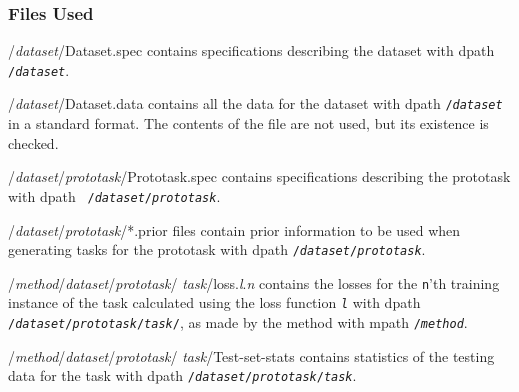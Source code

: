 \subsubsection*{Files Used}
\begin{ttdescription}
\item[/{\rm\em dataset\/}/Dataset.spec]
    contains specifications describing the dataset with dpath
    \texttt{/{\rm\em dataset}}.
\item[/{\rm\em dataset\/}/Dataset.data]
    contains all the data for the dataset with dpath
    \texttt{/{\rm\em dataset}} in a \delve{} standard format.  The contents of
    the file are not used, but its existence is checked.
\item[/{\rm\em dataset\/}/{\rm\em prototask\/}/Prototask.spec]
    contains specifications describing the prototask with dpath {\tt
    /{\rm\em dataset\/}/{\rm\em prototask}}.
\item[/{\rm\em dataset\/}/{\rm\em prototask\/}/*.prior]
    files contain prior information to be used when generating tasks for the 
    prototask with dpath \texttt{/{\rm\em dataset\/}/{\rm\em prototask}}.
\item[/{\rm\em method\/}/{\rm\em dataset\/}/{\rm\em prototask\/}/{\rm\em 
    task\/}/loss.\textit{l}.\textit{n}]
    contains the losses for the \texttt{n}'th training instance of the
    task calculated using the loss function \texttt{\textit{l}} with
    dpath \texttt{/{\rm\em dataset\/}/{\rm\em prototask\/}/{\rm\em task\/}/}, 
    as made by the method with mpath \texttt{/{\rm\em method}}.
\item[/{\rm\em method\/}/{\rm\em dataset\/}/{\rm\em prototask\/}/{\rm\em 
    task\/}/Test-set-stats]
    contains statistics of the testing data for the task with dpath
    \texttt{/{\rm\em dataset\/}/{\rm\em prototask\/}/{\rm\em task}}.
\end{ttdescription}

\newpage

\rhead[]{}%
\lhead[]{}%

